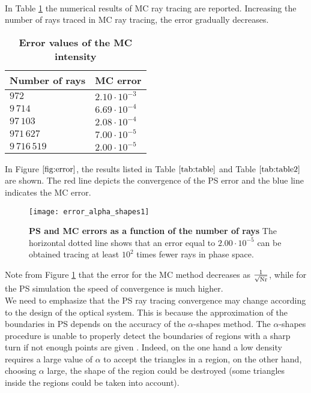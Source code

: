 \\ \indent In Table \ref{tab:table2} the numerical results of MC ray tracing are reported.
Increasing the number of rays traced in MC ray tracing, the error gradually decreases.
\begin{table}[htbp]
\centering
\caption{\bf Error values of the MC intensity}
\begin{tabular}{ll} \hline   Number of rays\; & MC error\\ \hline $972$  & $2.10\cdot10^{-3}$ \\
$9\,714$  & $6.69\cdot 10^{-4}$  \\ $97\,103$  & $2.08\cdot 10^{-4}$ \\ $971\,627$  & $7.00\cdot 10^{-5}$ \\ $9\,716\,519$  & $2.00\cdot 10^{-5}$ \\
 \hline
 \end{tabular}
 \label{tab:table2}
 \end{table}
\noindent In Figure $\ref{fig:error}$, the results listed in Table $\ref{tab:table}$ and Table $\ref{tab:table2}$ are shown. The red line depicts the convergence of the PS error and the blue line indicates the MC error.
\begin{figure}[h]
  \begin{center}
  \texttt{[image: error\_alpha\_shapes1]}
  \end{center}
  \caption{\textbf{PS and MC errors as a function of the number of rays}
  The horizontal dotted line shows that an error equal to $2.00 \cdot  10^{-5}$ can be obtained tracing at least $10^2$ times fewer rays in phase space.}
  \label{fig:error}
\end{figure}
Note from Figure \ref{fig:error} that the error for the MC method decreases as $\frac{1}{\sqrt{\textrm{Nr}}}$, while for the PS simulation the speed of convergence is much higher.\\ \indent
We need to emphasize that the PS ray tracing convergence may change according to the design of the optical system.
This is because the approximation of the boundaries in PS depends on the accuracy of the $\alpha$-shapes method.
The $\alpha$-shapes procedure is unable to properly detect the boundaries of regions with a sharp turn if not enough points are given
\cite{teichmann1998surface}. Indeed, on the one hand a low density requires a large value of $\alpha$ to accept the triangles in a region, on the other hand,
 choosing $\alpha$ large, the shape of the region could be destroyed (some triangles inside the regions could be taken into account).
